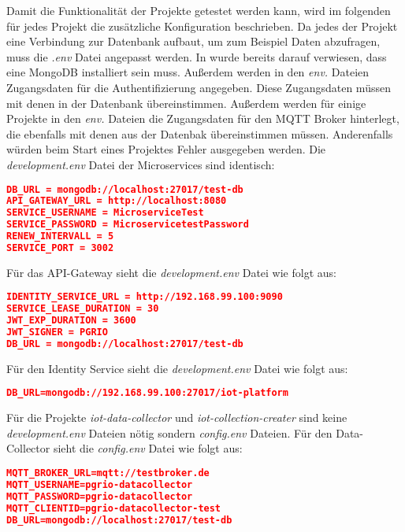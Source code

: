 Damit die Funktionalität der Projekte getestet werden kann, wird im folgenden für jedes Projekt die zusätzliche Konfiguration beschrieben. \newline
Da jedes der Projekt eine Verbindung zur Datenbank aufbaut, um zum Beispiel Daten abzufragen, muss die \textit{.env} Datei angepasst werden. In  wurde bereits darauf verwiesen, dass eine MongoDB installiert sein muss. Außerdem werden in den \textit{env.} Dateien Zugangsdaten für die Authentifizierung angegeben. Diese Zugangsdaten müssen mit denen in der Datenbank übereinstimmen. Außerdem werden für einige Projekte in den \textit{env.} Dateien die Zugangsdaten für den MQTT Broker hinterlegt, die ebenfalls mit denen aus der Datenbak übereinstimmen müssen. Anderenfalls würden beim Start eines Projektes Fehler ausgegeben werden. \newline
Die \textit{development.env} Datei der Microservices sind identisch: \newline
\begin{lstlisting}[language=json,firstnumber=1,basicstyle=\footnotesize]
DB_URL = mongodb://localhost:27017/test-db
API_GATEWAY_URL = http://localhost:8080
SERVICE_USERNAME = MicroserviceTest
SERVICE_PASSWORD = MicroservicetestPassword
RENEW_INTERVALL = 5
SERVICE_PORT = 3002
\end{lstlisting}
Für das API-Gateway sieht die \textit{development.env} Datei wie folgt aus: \newline
\begin{lstlisting}[language=json,firstnumber=1,basicstyle=\footnotesize]
IDENTITY_SERVICE_URL = http://192.168.99.100:9090
SERVICE_LEASE_DURATION = 30
JWT_EXP_DURATION = 3600
JWT_SIGNER = PGRIO
DB_URL = mongodb://localhost:27017/test-db
\end{lstlisting}
Für den Identity Service sieht die \textit{development.env} Datei wie folgt aus: \newline
\begin{lstlisting}[language=json,firstnumber=1,basicstyle=\footnotesize]
DB_URL=mongodb://192.168.99.100:27017/iot-platform
\end{lstlisting}
Für die Projekte \textit{iot-data-collector} und \textit{iot-collection-creater} sind keine \textit{development.env} Dateien nötig sondern \textit{config.env} Dateien. Für den Data-Collector sieht die \textit{config.env} Datei wie folgt aus: \newline
\begin{lstlisting}[language=json,firstnumber=1,basicstyle=\footnotesize]
MQTT_BROKER_URL=mqtt://testbroker.de
MQTT_USERNAME=pgrio-datacollector
MQTT_PASSWORD=pgrio-datacollector
MQTT_CLIENTID=pgrio-datacollector-test
DB_URL=mongodb://localhost:27017/test-db
\end{lstlisting}
